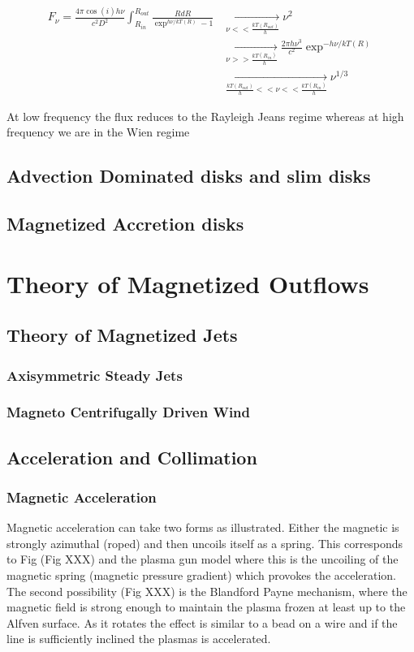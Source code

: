 \documentclass[10pt,a4paper,english,draft]{article}
\begin{document}
\begin{align}
F_{\nu} = \frac{4\pi \cos (i)h\nu}{c^2D^2} \int_{R_{in}}^{R_{out}}
\frac{RdR}{\exp^{h\nu/kT(R)}-1}
&\xrightarrow[\nu << \frac{kT(R_{out})}{h}]{} \nu^2  \\
& \xrightarrow[\nu >> \frac{kT(R_{in})}{h}]{} \frac{2\pi h \nu^3}{c^2}\exp ^{-h\nu/kT(R)}  \\
& \xrightarrow[\frac{kT(R_{out})}{h}<<\nu << \frac{kT(R_{in})}{h}]{} \nu^{1/3}
\end{align}


At low frequency the flux reduces to the Rayleigh Jeans regime whereas at 
high frequency we are in the Wien regime


\subsection{Advection Dominated disks and slim disks}
\subsection{Magnetized Accretion disks}

\section{Theory of Magnetized Outflows}
\subsection{Theory of Magnetized Jets}
\subsubsection{Axisymmetric Steady Jets}
\subsubsection{Magneto Centrifugally Driven Wind}
\subsection{Acceleration and Collimation}
\subsubsection{Magnetic Acceleration}

Magnetic acceleration can take two forms as illustrated. Either the magnetic is strongly
azimuthal (roped) and then uncoils itself as a spring. This corresponds to Fig (Fig XXX)
and the plasma gun model where this is the uncoiling of the magnetic spring (magnetic pressure gradient)
which provokes the acceleration. The second possibility (Fig XXX) is the Blandford Payne mechanism, where the magnetic field
is strong enough to maintain the plasma frozen at least up to the Alfven surface. As it rotates the effect is similar to a bead
on a wire and if the line is sufficiently inclined the plasmas is accelerated.
\end{document}
